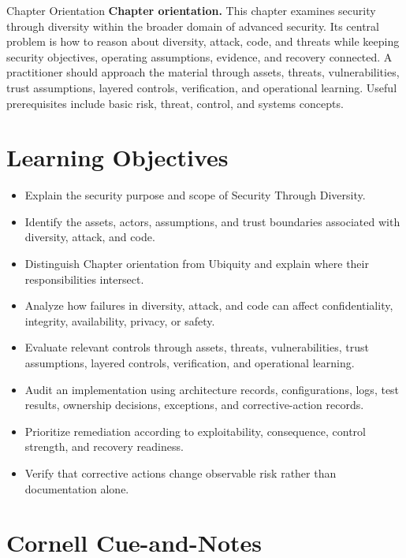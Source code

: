 \documentclass[11pt,letterpaper]{article}
\title{\CornellDocumentTitle}
\author{}
\date{}
\begin{document}
\maketitle
\begin{CornellOverviewBox}{Chapter Orientation}
\textbf{Chapter orientation.} This chapter examines security through diversity within the broader domain of advanced security. Its central problem is how to reason about diversity, attack, code, and threats while keeping security objectives, operating assumptions, evidence, and recovery connected. A practitioner should approach the material through assets, threats, vulnerabilities, trust assumptions, layered controls, verification, and operational learning. Useful prerequisites include basic risk, threat, control, and systems concepts.
\end{CornellOverviewBox}
\section*{Learning Objectives}
\begin{itemize}
\item Explain the security purpose and scope of Security Through Diversity.
\item Identify the assets, actors, assumptions, and trust boundaries associated with diversity, attack, and code.
\item Distinguish Chapter orientation from Ubiquity and explain where their responsibilities intersect.
\item Analyze how failures in diversity, attack, and code can affect confidentiality, integrity, availability, privacy, or safety.
\item Evaluate relevant controls through assets, threats, vulnerabilities, trust assumptions, layered controls, verification, and operational learning.
\item Audit an implementation using architecture records, configurations, logs, test results, ownership decisions, exceptions, and corrective-action records.
\item Prioritize remediation according to exploitability, consequence, control strength, and recovery readiness.
\item Verify that corrective actions change observable risk rather than documentation alone.
\end{itemize}
\section*{Cornell Cue-and-Notes}
\end{document}
